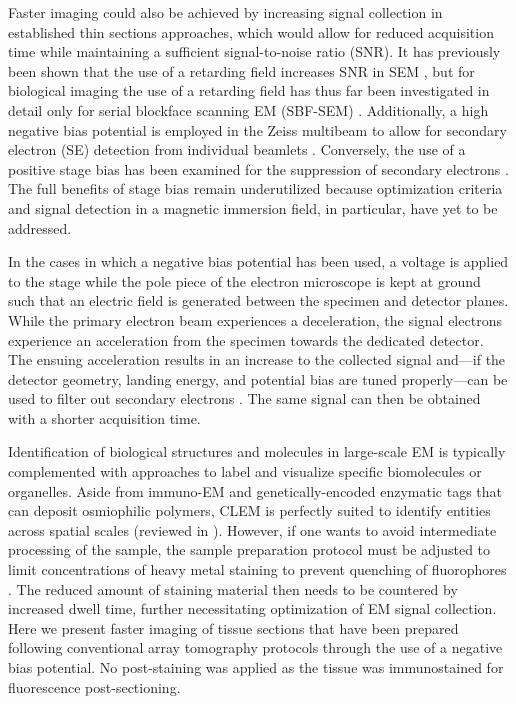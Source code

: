 Faster imaging could also be achieved by increasing signal collection in established thin sections approaches, which would allow for reduced acquisition time while maintaining a sufficient signal-to-noise ratio (SNR). It has previously been shown that the use of a retarding field increases SNR in SEM \cite{paden1968retarding, phifer2009improving}, but for biological imaging the use of a retarding field has thus far been investigated in detail only for serial blockface scanning EM (SBF-SEM) \cite{ohta2012beam, titze2013automated, bouwer2016deceleration}. Additionally, a high negative bias potential is employed in the Zeiss multibeam to allow for secondary electron (SE) detection from individual beamlets \cite{eberle2015high}. Conversely, the use of a positive stage bias has been examined for the suppression of secondary electrons \cite{xu2017enhanced}. The full benefits of stage bias remain underutilized because optimization criteria and signal detection in a magnetic immersion field, in particular, have yet to be addressed.

In the cases in which a negative bias potential has been used, a voltage is applied to the stage while the pole piece of the electron microscope is kept at ground such that an electric field is generated between the specimen and detector planes. While the primary electron beam experiences a deceleration, the signal electrons experience an acceleration from the specimen towards the dedicated detector. The ensuing acceleration results in an increase to the collected signal \cite{vsakic2011boron} and—if the detector geometry, landing energy, and potential bias are tuned properly—can be used to filter out secondary electrons \cite{bouwer2016deceleration}. The same signal can then be obtained with a shorter acquisition time.

Identification of biological structures and molecules in large-scale EM is typically complemented with approaches to label and visualize specific biomolecules or organelles. Aside from immuno-EM and genetically-encoded enzymatic tags that can deposit osmiophilic polymers, CLEM is perfectly suited to identify entities across spatial scales (reviewed in \textcite{de2015correlated}). However, if one wants to avoid intermediate processing of the sample, the sample preparation protocol must be adjusted to limit concentrations of heavy metal staining to prevent quenching of fluorophores \cite{kuipers2015scanning}. The reduced amount of staining material then needs to be countered by increased dwell time, further necessitating optimization of EM signal collection. Here we present faster imaging of tissue sections that have been prepared following conventional array tomography protocols through the use of a negative bias potential. No post-staining was applied as the tissue was immunostained for fluorescence post-sectioning.

